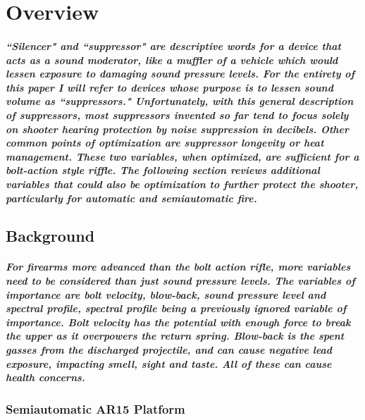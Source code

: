\chapter{Overview}


\paragraph{``Silencer" and ``suppressor" are descriptive words for a device that acts as a sound moderator, like a muffler of a vehicle which would lessen exposure to damaging sound pressure levels. For the entirety of this paper I will refer to devices whose purpose is to lessen sound volume as ``suppressors." Unfortunately, with this general description of suppressors, most suppressors invented so far tend to focus solely on shooter hearing protection by noise suppression in decibels. Other common points of optimization are suppressor longevity or heat management. These two variables, when optimized, are sufficient for a bolt-action style riffle. The following section reviews additional variables that could also be optimization to further protect the shooter, particularly for automatic and semiautomatic fire.\cite{bull2004}}





\section{Background}

\paragraph{For firearms more advanced than the bolt action rifle, more variables need to be considered than just sound pressure levels. The variables of importance are bolt velocity, blow-back, sound pressure level and spectral profile, spectral profile being a previously ignored variable of importance. Bolt velocity has the potential with enough force to break the upper as it overpowers the return spring. Blow-back is the spent gasses from the discharged projectile, and can cause negative lead exposure, impacting smell, sight and taste. All of these can cause health concerns.}






\subsection{Semiautomatic AR15 Platform}

